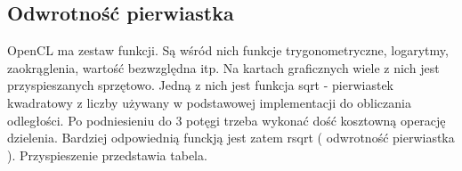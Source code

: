 \subsection { Odwrotność pierwiastka }
OpenCL ma zestaw funkcji. Są wśród nich funkcje trygonometryczne, logarytmy, zaokrąglenia, wartość bezwzględna itp. Na kartach graficznych wiele z nich jest przyspieszanych sprzętowo. Jedną z nich jest funkcja sqrt - pierwiastek kwadratowy z liczby używany w podstawowej implementacji do obliczania odległości. Po podniesieniu do 3 potęgi trzeba wykonać dość kosztowną operację dzielenia. Bardziej odpowiednią funckją jest zatem rsqrt ( odwrotność pierwiastka ). Przyspieszenie przedstawia tabela.
